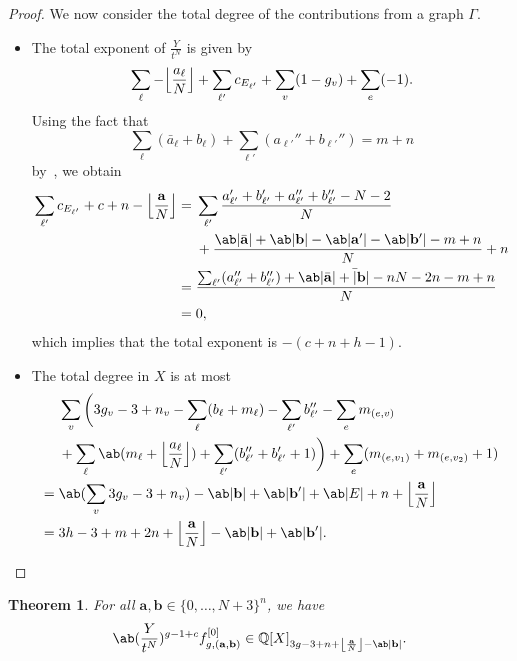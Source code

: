 \documentclass[10pt]{amsart}
\DeclarePairedDelimiter{\floor}{\lfloor}{\rfloor}
\newtheorem{thm}{Theorem}[section]
\theoremstyle{definition}
\theoremstyle{remark}
\theoremstyle{plain}
\theoremstyle{definition}
\theoremstyle{remark}
\newcommand{\Q}{\mathbb{Q}}
\newcommand{\ba}{\mathbf{a}}
\newcommand{\bb}{\mathbf{b}}
\newcommand{\1}{\mathbf{1}}
\newcommand{\2}{\mathbf{2}}
\newcommand{\3}{\mathbf{3}}
\numberwithin{equation}{section}
\begin{document}
\begin{proof}
    We now consider the total degree of the contributions from a graph $\Gamma$.
    \begin{itemize}
        \item The total exponent of $\frac{Y}{t^N}$ is given by
            \[ \sum_{\ell} -\floor*{\frac{a_{\ell}}{N}} + \sum_{\ell'} c_{E_{\ell'}} + \sum_v (1-g_v) +\sum_e (-1). \]
            Using the fact that
            \[ \sum_{\ell} (\bar{a}_{\ell} + b_{\ell}) + \sum_{\ell'} (a_{\ell'}'' + b_{\ell'}'') = m+n \]
            by~, we obtain
            \begin{align*}
                \sum_{\ell'} c_{E_{\ell'}} + c + n - \floor*{\frac{\ba}{N}} ={}& \sum_{\ell'} \frac{a'_{\ell'} + b'_{\ell'} + a''_{\ell'} + b''_{\ell'}-N-2}{N} \\ 
                &+ \frac{\ab|\bar{\ba}| + \ab|\bb| - \ab|\ba'| - \ab|\bb'| -m+n}{N} + n \\
                ={}& \frac{\sum_{\ell'}(a''_{\ell'}+b''_{\ell'})+\ab|\bar{\ba}| + \bar|\bb| -nN - 2n -m+n }{N} \\
                ={}& 0,
            \end{align*}
            which implies that the total exponent is $-(c+n+h-1)$.
        \item The total degree in $X$ is at most 
            \begin{align*}
                &\sum_v \bigg(3g_v-3+n_v - \sum_{\ell}(b_{\ell}+m_{\ell})-\sum_{\ell'} b''_{\ell'} - \sum_e m_{(e,v)} \\
                &+ \sum_{\ell} \ab(m_{\ell}+\floor*{\frac{a_{\ell}}{N}}) + \sum_{\ell'} (b''_{\ell'}+b'_{\ell'}+1) \bigg) + \sum_e (m_{(e,v_1)}+ m_{(e,v_2)}+1) \\
                ={}& \ab(\sum_v 3g_v-3+n_v) - \ab|\bb| + \ab|\bb'| + \ab|E| + n + \floor*{\frac{\ba}{N}} \\
                ={}& 3h-3+m+2n+\floor*{\frac{\ba}{N}} - \ab|\bb| + \ab|\bb'|. \qedhere
            \end{align*}
    \end{itemize}
\end{proof}

\begin{thm}
    For all $\ba, \bb \in \{0,\ldots,N+3\}^n$, we have
    \[ \ab(\frac{Y}{t^N})^{g-1+c} f_{g,(\ba,\bb)}^{[0]} \in \Q[X]_{3g-3+n+\floor*{\frac{\ba}{N}} - \ab|\bb|}. \]
\end{thm}
\end{document}
